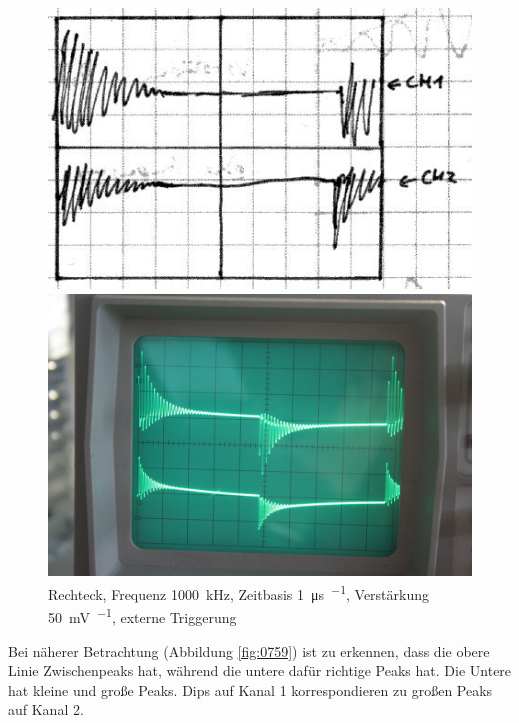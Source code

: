 \begin{figure}[htbp]
	\centering
	\begin{minipage}{.45\linewidth}
	\includegraphics[width=\linewidth]{Skizzen/IMG_0757-1500.jpg}
	\end{minipage}
	\hfill
	\begin{minipage}{.45\linewidth}
	\includegraphics[width=\linewidth]{Fotos/IMG_0757-1500.jpg}
	\end{minipage}
	\caption{%
		Rechteck, Frequenz \SI{1000}{\kilo\hertz}, Zeitbasis \SI{1}{\micro\second\per\division}, Verstärkung \SI{50}{\milli\volt\per\division}, externe Triggerung
	}
	\label{fig:0757}
\end{figure}

Bei näherer Betrachtung (Abbildung \ref{fig:0759}) ist zu erkennen, dass die
obere Linie Zwischenpeaks hat, während die untere dafür richtige Peaks hat. Die
Untere hat kleine und große Peaks. Dips auf Kanal 1 korrespondieren zu großen
Peaks auf Kanal 2.

